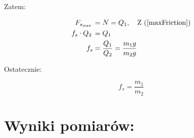 \documentclass[a4paper,12pt]{article}
\begin{document}
Zatem:

\begin{align*}
	F_{s_{\max}}\, & = N = Q_1,\quad \text{Z (\ref{maxFriction})} \\
	f_s \cdot Q_2\, & = Q_1                                        \\
	f_s            & = \frac{Q_1}{Q_2} = \frac{m_1 g}{m_2 g}
\end{align*}

Ostatecznie:

\begin{equation}
	f_s = \frac{m_1}{m_2}
\end{equation}

\section{Wyniki pomiarów:}
\end{document}
